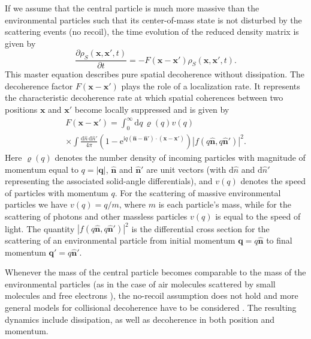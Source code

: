 \documentclass[aps,pra,reprint,amsmath,amssymb,showpacs,nofootinbib,floatfix,onecolumn,12pt]{revtex4-1}
\providecommand{\abs}[1]{\left\lvert#1\right\rvert}
\newcommand{\D}{\text{d}}
\newcommand{\E}{\text{e}}
\newcommand{\I}{\text{i}}
\newcommand{\bvec}[1]{\ensuremath{\mathbf{#1}}}
\newcommand{\buvec}[1]{\ensuremath{\mathbf{\hat{#1}}}}
\begin{document}
If we assume that the central particle is much more massive than the environmental particles such that its center-of-mass state is not disturbed by the
  scattering events (no recoil), the time evolution of the reduced density matrix is given by \cite{Joos:1985:iu,Gallis:1990:un,Diosi:1995:um,Hornberger:2003:un,Schlosshauer:2007:un}
%
\begin{equation} 
\label{eq:scatq} 
\frac{\partial \rho_S(\bvec{x}, \bvec{x}', t)}{\partial t} 
= - F(\bvec{x} - \bvec{x}') \rho_S(\bvec{x}, \bvec{x}', t).
\end{equation}
%
This master equation describes pure spatial decoherence without dissipation. The decoherence factor $F(\bvec{x} - \bvec{x}')$ plays the role of a localization rate. It represents the characteristic decoherence rate at which spatial coherences between two positions $\bvec{x}$ and $\bvec{x}'$ become locally suppressed and is given by
%
\begin{multline}
\label{eq:scatf}
  F(\bvec{x} - \bvec{x}') =  \int_0^\infty \D q \,
 \varrho(q) v(q) \\\times \int \frac{\D \hat{n}\,\D \hat{n}'}{4\pi}  \left(1- \E^{\I
    q\left(\buvec{n} - \buvec{n}'\right) \cdot \left( \bvec{x} - \bvec{x'}
    \right) } \right) \abs{ f(q\buvec{n}, q\buvec{n}') }^2.
\end{multline}
%
Here $\varrho(q)$ denotes the number density of incoming particles with magnitude of momentum equal to $q=\abs{\bvec{q}}$, $\buvec{n}$ and $\buvec{n}'$ are unit vectors (with $\D \hat{n}$ and $\D \hat{n}'$ representing the associated solid-angle differentials), and $v(q)$ denotes the speed of particles with momentum $q$. For the scattering of massive environmental particles we have $v(q) = q/m$, where $m$ is each particle's mass, while for the scattering of photons and other massless particles $v(q)$ is equal to the speed of light. The quantity $\abs{ f(q\buvec{n}, q\buvec{n}')}^2$ is the differential cross section for the scattering of an environmental particle from initial momentum $\bvec{q}=q\buvec{n}$ to final momentum $\bvec{q}'=q\buvec{n}'$.

Whenever the mass of the central particle becomes comparable to the mass of the environmental particles (as in the case of air molecules scattered by small molecules and free electrons \cite{Tegmark:1993:uz}), the no-recoil assumption does not hold and more general models for collisional decoherence have to be considered \cite{Diosi:1995:um,Hornberger:2006:tb}. The resulting dynamics include dissipation, as well as decoherence in both position and momentum. 
\end{document}
